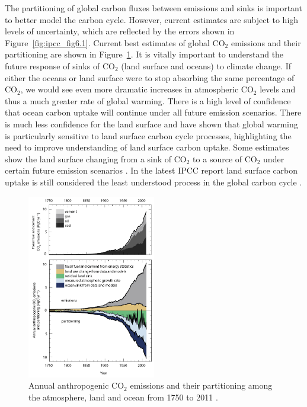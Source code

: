 \documentclass[12pt]{article}
\begin{document}
The partitioning of global carbon fluxes between emissions and sinks is important to better model the carbon cycle. However, current estimates are subject to high levels of uncertainty, which are reflected by the errors shown in Figure~\ref{fig:ipcc_fig6.1}. Current best estimates of global CO\(_{2}\) emissions and their partitioning are shown in Figure~\ref{fig:ipcc_fig6.8}. It is vitally important to understand the future response of sinks of CO\(_{2}\) (land surface and oceans) to climate change. If either the oceans or land surface were to stop absorbing the same percentage of CO\(_{2}\), we would see even more dramatic increases in atmospheric CO\(_{2}\) levels and thus a much greater rate of global warming. There is a high level of confidence that ocean carbon uptake will continue under all future emission scenarios. There is much less confidence for the land surface and \citet{1748-9326-7-2-024002} have shown that global warming is particularly sensitive to land surface carbon cycle processes, highlighting the need to improve understanding of land surface carbon uptake. Some estimates show the land surface changing from a sink of CO\(_{2}\) to a source of CO\(_{2}\) under certain future emission scenarios \citep{sitch2008evaluation, cox2000, scholze2006climate}. In the latest IPCC report land surface carbon uptake is still considered the least understood process in the global carbon cycle \citep{ciais2014carbon}.

\begin{figure}[ht]
    \centering
    \includegraphics[width=0.5\textwidth]{ipcc_fig6_8.jpg}
    \caption{Annual anthropogenic CO\(_{2}\) emissions and their partitioning among the atmosphere, land and ocean from 1750 to 2011  \citep{ciais2014carbon}.}
    \label{fig:ipcc_fig6.8}
\end{figure}
\end{document}
